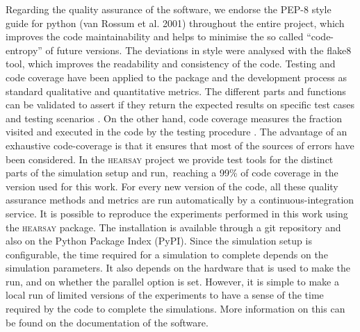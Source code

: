\documentclass[crop]{CSLB}
\newcommand{\hs}{\textsc{hearsay}}
\begin{document}
%
Regarding the quality assurance of the software, we endorse the PEP-8 style
guide for python (van Rossum et al. 2001) throughout the entire project, which
improves the code maintainability and helps to minimise the so called
``code-entropy'' of future versions.
%
The deviations in style were analysed with the flake8 tool, which improves the
readability and consistency of the code.
%
Testing and code coverage have been applied to the package and the development
process as standard qualitative and quantitative metrics.
%
The different parts and functions can be validated to assert if they return the
expected results on specific test cases and testing scenarios
\citep{jazayeri_engeneering_2007}.
%
On the other hand, code coverage measures the fraction visited and executed in
the code by the testing procedure \citep{miller_testing_1963}.
%
The advantage of an exhaustive code-coverage is that it ensures that most of
the sources of errors have been considered.
%
In the \hs{} project we provide test tools for the distinct parts of the
simulation setup and run, reaching a 99\% of code coverage in the version used
for this work.
%
For every new version of the code, all these quality assurance methods and
metrics are run automatically by a continuous-integration service.
%
It is possible to reproduce the experiments performed in this work using the
\hs{} package.
%
The installation is available through a git repository and also on the Python
Package Index (PyPI).
%
Since the simulation setup is configurable, the time required for a simulation
to complete depends on the simulation parameters.
%
It also depends on the hardware that is used to make the run, and on whether
the parallel option is set.
%
However, it is simple to make a local run of limited versions of the
experiments to have a sense of the time required by the code to complete the
simulations.
%
More information on this can be found on the documentation of the software.

\end{document}
